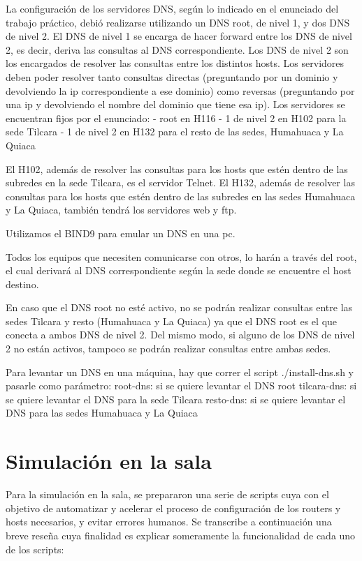 \documentclass[12pt,titlepage]{article}
\begin{document}
La configuraci\'on de los servidores DNS, seg\'un lo indicado en el enunciado del trabajo pr\'actico, debi\'o realizarse utilizando un DNS root, de nivel 1, y dos DNS de nivel 2. 
El DNS de nivel 1 se encarga de hacer forward entre los DNS de nivel 2, es decir, deriva las consultas al DNS correspondiente.
Los DNS de nivel 2 son los encargados de resolver las consultas entre los distintos hosts.
Los servidores deben poder resolver tanto consultas directas (preguntando por un dominio y devolviendo la ip correspondiente a ese dominio) como reversas (preguntando por una ip y devolviendo el nombre del dominio que tiene esa ip).
Los servidores se encuentran fijos por el enunciado:
	- root en H116
	- 1 de nivel 2 en H102 para la sede Tilcara
	- 1 de nivel 2 en H132 para el resto de las sedes, Humahuaca y La Quiaca

El H102, adem\'as de resolver las consultas para los hosts que est\'en dentro de las subredes en la sede Tilcara, es el servidor Telnet.
El H132, adem\'as de resolver las consultas para los hosts que est\'en dentro de las subredes en las sedes Humahuaca y La Quiaca, tambi\'en tendr\'a los servidores web y ftp.

Utilizamos el BIND9 para emular un DNS en una pc.

Todos los equipos que necesiten comunicarse con otros, lo har\'an a trav\'es del root, el cual derivar\'a al DNS correspondiente seg\'un la sede donde se encuentre el host destino.

En caso que el DNS root no est\'e activo, no se podr\'an realizar consultas entre las sedes Tilcara y resto (Humahuaca y La Quiaca) ya que el DNS root es el que conecta a ambos DNS de nivel 2.
Del mismo modo, si alguno de los DNS de nivel 2 no est\'an activos, tampoco se podr\'an realizar consultas entre ambas sedes.

Para levantar un DNS en una m\'aquina, hay que correr el script ./install-dns.sh y pasarle como par\'ametro:
	root-dns: si se quiere levantar el DNS root
	tilcara-dns: si se quiere levantar el DNS para la sede Tilcara
	resto-dns: si se quiere levantar el DNS para las sedes Humahuaca y La Quiaca

\section{Simulación en la sala}
Para la simulaci\'on en la sala, se prepararon una serie de scripts cuya con el objetivo de automatizar y acelerar el proceso de configuraci\'on de los routers y hosts necesarios, y evitar errores humanos.
Se transcribe a continuaci\'on una breve reseña cuya finalidad es explicar someramente la funcionalidad de cada uno de los scripts:
\end{document}
